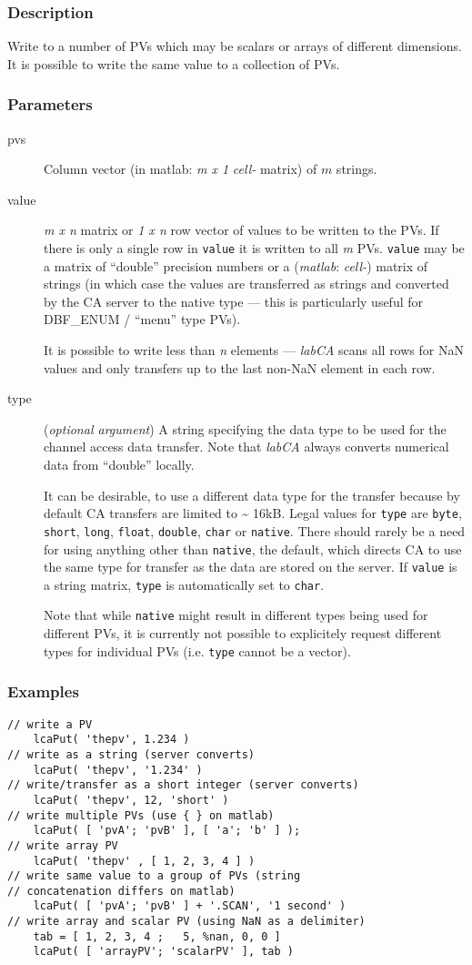 \documentclass{article}
\newcommand{\sca}{\ita{labCA}}
\newcommand{\matlab}{\ita{matlab}}
\newcommand{\com}[1]{{\tt #1}}
\newcommand{\NAN}{\mbox{NaN}}
\newcommand{\ita}[1]{\emph{#1}}
\newcommand{\m}{$m$}
\newcommand{\mhack}{$m$} %
\newcommand{\n}{$n$}
\newcommand{\mxn}{$m\times n$}
\newcommand{\mxl}{$m\times 1$}
\newcommand{\lxn}{$1\times n$}
\newcommand{\calimit}{$\approx 16$kB}
\renewcommand{\m}{\ita{m}}
\newcommand{\mhack}{\ita{m}} %
\renewcommand{\n}{\ita{n}}
\renewcommand{\mxn}{\ita{m x n}}
\renewcommand{\mxl}{\ita{m x 1}}
\renewcommand{\lxn}{\ita{1 x n}}
\renewcommand{\calimit}{\~{} 16kB}
\newcommand{\PVITEM}{
\item[pvs] Column vector (in matlab: \mxl{} \ita{cell-} matrix)
of \mhack{} strings.
}
\begin{document}
\subsubsection{Description}
Write to a number of PVs which may be scalars or arrays of different
dimensions. It is possible to write the same value to a collection of PVs.
\subsubsection{Parameters}
\begin{description}
\PVITEM
%
%
\item[value] \mxn{} matrix or \lxn{} row vector of values
to be written to the PVs. If there is only a single row in \com{value}{}
it is written to all \m{} PVs. \com{value} may be a matrix of ``double''
precision numbers or  a (\matlab: \ita{cell-}) matrix of strings (in
which case the values are transferred as strings and converted by the
CA server to the native type --- this is particularly useful for
DBF\_ENUM / ``menu'' type PVs).

It is possible to write less than \n{} elements --- \sca{} scans all rows
for \NAN{} values and only transfers up to the last non-\NAN{} element in each
row.
%
%
\item[type] (\ita{optional argument}) A string specifying the
data type to be used for the channel access data transfer. Note
that \sca{} always converts numerical data from ``double'' locally.

It can be desirable, to use a different data type for the
transfer because by default CA transfers are limited to \calimit.
Legal values for \com{type}{} are \com{byte}, \com{short}, \com{long},
\com{float}, \com{double}, \com{char} or \com{native}. There should rarely
be a need for using anything other than \com{native}, the default,
which directs CA to use the same type for transfer as the data are
stored on the server. If \com{value} is a string matrix, \com{type}
is automatically set to \com{char}.

Note that while \com{native}{} might result in different types
being used for different PVs, it is currently not possible to
explicitely request different types for individual PVs (i.e. 
\com{type}{} cannot be a vector).
%
\end{description}

\subsubsection{Examples}
\begin{verbatim}
// write a PV
    lcaPut( 'thepv', 1.234 )
// write as a string (server converts)
    lcaPut( 'thepv', '1.234' )
// write/transfer as a short integer (server converts)
    lcaPut( 'thepv', 12, 'short' )
// write multiple PVs (use { } on matlab)
    lcaPut( [ 'pvA'; 'pvB' ], [ 'a'; 'b' ] );
// write array PV
    lcaPut( 'thepv' , [ 1, 2, 3, 4 ] )
// write same value to a group of PVs (string
// concatenation differs on matlab)
    lcaPut( [ 'pvA'; 'pvB' ] + '.SCAN', '1 second' )
// write array and scalar PV (using NaN as a delimiter)
    tab = [ 1, 2, 3, 4 ;   5, %nan, 0, 0 ]
	lcaPut( [ 'arrayPV'; 'scalarPV' ], tab )
\end{verbatim}
\end{document}
